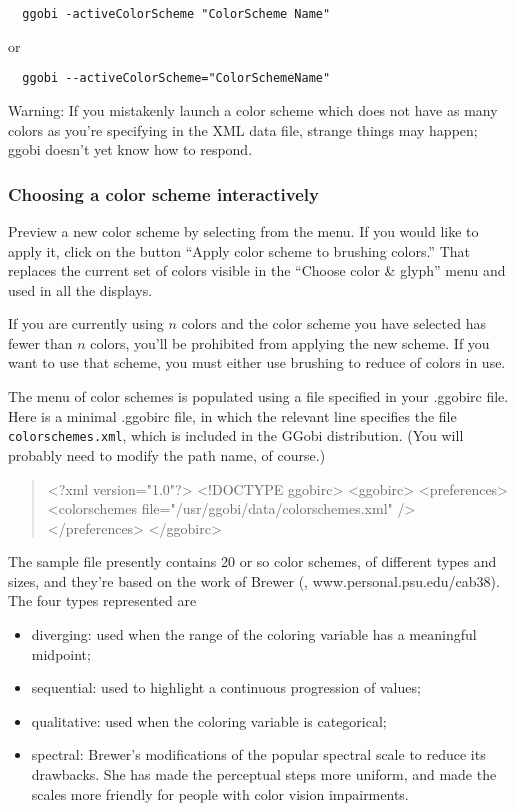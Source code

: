 \documentclass[11pt]{article}
\begin{document}
\begin{verbatim}
  ggobi -activeColorScheme "ColorScheme Name"
\end{verbatim}
  or   
\begin{verbatim}
  ggobi --activeColorScheme="ColorSchemeName"
\end{verbatim}

Warning: If you mistakenly launch a color scheme which does not have
as many colors as you're specifying in the XML data file, strange
things may happen; ggobi doesn't yet know how to respond.

\subsubsection{Choosing a color scheme interactively}

Preview a new color scheme by selecting from the menu.  If you would
like to apply it, click on the button ``Apply color scheme to brushing
colors.''  That replaces the current set of colors visible in the
``Choose color \& glyph'' menu and used in all the displays.

If you are currently using $n$ colors and the color scheme
you have selected
has fewer than $n$ colors, you'll be prohibited from applying
the new scheme.  If you want to use that scheme, you must either
use brushing to reduce of colors in use.

The menu of color schemes is populated using a file specified in your
.ggobirc file.  Here is a minimal .ggobirc file, in which the relevant
line specifies the file {\tt colorschemes.xml}, which is included in the
GGobi distribution.  (You will probably need to modify the path name,
of course.)

\begin{quote}
<?xml version="1.0"?>
<!DOCTYPE ggobirc>
<ggobirc>
<preferences>
  <colorschemes file="/usr/ggobi/data/colorschemes.xml" />
</preferences>
</ggobirc>
\end{quote}

The sample file presently contains 20 or so color schemes, of
different types and sizes, and they're based on the work of
Brewer (\cite{Brewer99}, www.personal.psu.edu/cab38).
The four types represented are

\begin{itemize}
\item diverging: used when the range of the coloring variable has
      a meaningful midpoint;
\item sequential: used to highlight a continuous progression of values;
\item qualitative: used when the coloring variable is categorical;
\item spectral: Brewer's modifications of the popular spectral scale
      to reduce its drawbacks.  She has made the perceptual steps
      more uniform, and made the scales more friendly for people with
      color vision impairments.
\end{itemize}
\end{document}
